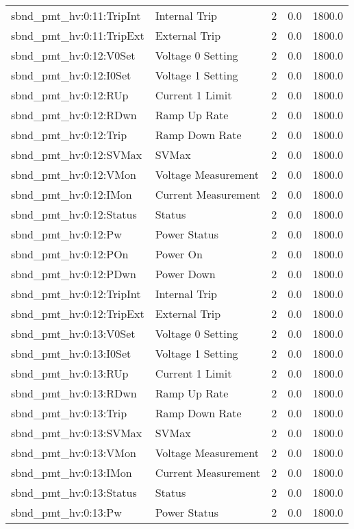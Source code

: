 \begin{center}
\begin{longtable}{l | l l l l }
sbnd\_pmt\_hv:0:11:TripInt & Internal Trip & 2 & 0.0 & 1800.0\\ 
sbnd\_pmt\_hv:0:11:TripExt & External Trip & 2 & 0.0 & 1800.0\\ 
sbnd\_pmt\_hv:0:12:V0Set & Voltage 0 Setting & 2 & 0.0 & 1800.0\\ 
sbnd\_pmt\_hv:0:12:I0Set & Voltage 1 Setting & 2 & 0.0 & 1800.0\\ 
sbnd\_pmt\_hv:0:12:RUp & Current 1 Limit & 2 & 0.0 & 1800.0\\ 
sbnd\_pmt\_hv:0:12:RDwn & Ramp Up Rate & 2 & 0.0 & 1800.0\\ 
sbnd\_pmt\_hv:0:12:Trip & Ramp Down Rate & 2 & 0.0 & 1800.0\\ 
sbnd\_pmt\_hv:0:12:SVMax & SVMax & 2 & 0.0 & 1800.0\\ 
sbnd\_pmt\_hv:0:12:VMon & Voltage Measurement & 2 & 0.0 & 1800.0\\ 
sbnd\_pmt\_hv:0:12:IMon & Current Measurement & 2 & 0.0 & 1800.0\\ 
sbnd\_pmt\_hv:0:12:Status & Status & 2 & 0.0 & 1800.0\\ 
sbnd\_pmt\_hv:0:12:Pw & Power Status & 2 & 0.0 & 1800.0\\ 
sbnd\_pmt\_hv:0:12:POn & Power On & 2 & 0.0 & 1800.0\\ 
sbnd\_pmt\_hv:0:12:PDwn & Power Down & 2 & 0.0 & 1800.0\\ 
sbnd\_pmt\_hv:0:12:TripInt & Internal Trip & 2 & 0.0 & 1800.0\\ 
sbnd\_pmt\_hv:0:12:TripExt & External Trip & 2 & 0.0 & 1800.0\\ 
sbnd\_pmt\_hv:0:13:V0Set & Voltage 0 Setting & 2 & 0.0 & 1800.0\\ 
sbnd\_pmt\_hv:0:13:I0Set & Voltage 1 Setting & 2 & 0.0 & 1800.0\\ 
sbnd\_pmt\_hv:0:13:RUp & Current 1 Limit & 2 & 0.0 & 1800.0\\ 
sbnd\_pmt\_hv:0:13:RDwn & Ramp Up Rate & 2 & 0.0 & 1800.0\\ 
sbnd\_pmt\_hv:0:13:Trip & Ramp Down Rate & 2 & 0.0 & 1800.0\\ 
sbnd\_pmt\_hv:0:13:SVMax & SVMax & 2 & 0.0 & 1800.0\\ 
sbnd\_pmt\_hv:0:13:VMon & Voltage Measurement & 2 & 0.0 & 1800.0\\ 
sbnd\_pmt\_hv:0:13:IMon & Current Measurement & 2 & 0.0 & 1800.0\\ 
sbnd\_pmt\_hv:0:13:Status & Status & 2 & 0.0 & 1800.0\\ 
sbnd\_pmt\_hv:0:13:Pw & Power Status & 2 & 0.0 & 1800.0\\ 

\end{longtable}
\end{center}
